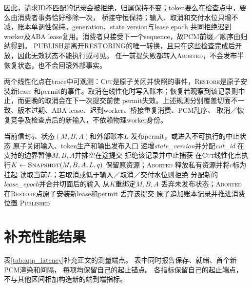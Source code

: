 因此，请求ID不匹配的记录会被拒绝，归属保持不变；token要么在检查点中，要么由消费者事务恰好移除一次，
桥接守恒保持；输入、取消和交付水位只增不减，账本单调性保持。generation、state version与lease epoch
共同拒绝迟到worker及ABA lease复用。消费者只接受下一个sequence，故PCM前缀／顺序由归纳得到。
PUBLISH是离开RESTORING的唯一转换，且只在这些检查完成后开放，因此无效状态不能执行或可见。
任一前提失败都转入\textsc{Aborted}，不会发布半恢复状态，也不会回滚外部事实。

两个线性化点在trace中可观测：\textsc{Cut}是原子关闭并快照的事件，\textsc{Restore}是原子安装新lease
和permit的事件。取消在线性化时写入账本；恢复若观察到该记录则中止，而更晚的取消会在下一次提交前使
permit失效。上述规则分别覆盖切面不一致、版本过期、ABA lease、迟到worker、桥接重复消费、PCM乱序、
取消／恢复竞争及检查点后的新输入，不依赖物理worker身份。

\begin{algorithm}[tbp]
\caption{逻辑请求$r$的保存／恢复协议。}
\label{alg:save_resume}
\begin{algorithmic}[1]
\Require 当前信封$q$、状态$(M,B,A)$和外部账本$L$
\Ensure 发布permit，或进入不可执行的中止状态
\State 原子关闭输入、token生产和输出发布入口
\State 递增\textit{state\_version}并分配\textit{cut\_id}
\State 在支持的边界暂停$M,B,A$并排空在途提交
    \State 拒绝该记录并中止捕获
\EndIf
\State 在\textsc{Cut}线性化点执行$K\gets\Call{Snapshot}{M,B,A,L,q}$
    \State 保留原资源；\Return \textsc{Aborted}
\EndIf
\State 释放私有资源并将$r$标为挂起
\State 读取当前$L$；若取消或低于输入／取消／交付水位则拒绝
\State 分配新的\textit{lease\_epoch}并合并切面后的输入
\State 从$K$重绑定$M,B,A$
    \State 丢弃未发布状态；\Return \textsc{Aborted}
\EndIf
\State 在\textsc{Restore}点原子安装新lease和permit
        \State 丢弃该提交
    \Else
        \State 原子追加账本记录并推进消费位置
    \EndIf
\EndWhile
\State \Return \textsc{Published}
\end{algorithmic}
\end{algorithm}


\section{补充性能结果}
\label{app:performance}

表\ref{tab:app_latency}补充正文的测量端点。
表中同时报告保存、就绪、首个新PCM渲染和间隔，
每项均保留自己的起止锚点。
各指标保留自己的起止端点，
不与其他区间相加构造新的端到端指标。

